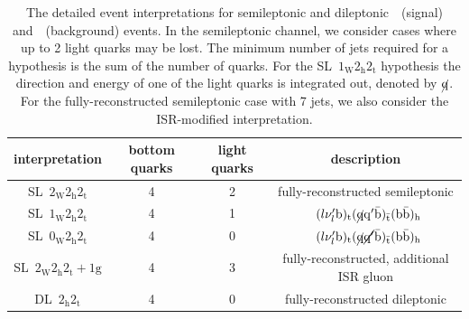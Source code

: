 \begin{table}[h!]
\begin{center}
\begin{tabular}{c|ccc}
\hline
interpretation & bottom quarks & light quarks & description \\
\hline
SL~$2_{\mathrm{W}} 2_{\mathrm{h}} 2_{\mathrm{t}}$ & 4 & 2 & fully-reconstructed semileptonic \\
SL~$1_{\mathrm{W}} 2_{\mathrm{h}} 2_{\mathrm{t}}$ & 4 & 1 &~$(l \nu_{l}' \mathrm{b})_{\mathrm{t}} (\cancel{\mathrm{q}} \mathrm{q}' \bar{\mathrm{b}})_{\bar{\mathrm{t}}} (\mathrm{b} \bar{\mathrm{b}})_{\mathrm{h}}$ \\
SL~$0_{\mathrm{W}} 2_{\mathrm{h}} 2_{\mathrm{t}}$ & 4 & 0 &~$(l \nu_{l}' \mathrm{b})_{\mathrm{t}} (\cancel{\mathrm{q}} \cancel{\mathrm{q}'} \bar{\mathrm{b}})_{\bar{\mathrm{t}}} (\mathrm{b} \bar{\mathrm{b}})_{\mathrm{h}}$ \\
SL~$2_{\mathrm{W}} 2_{\mathrm{h}} 2_{\mathrm{t}}+1\mathrm{g}$ & 4 & 3 & fully-reconstructed, additional ISR gluon \\
\hline
DL~$2_{\mathrm{h}} 2_{\mathrm{t}}$ & 4 & 0 & fully-reconstructed dileptonic \\
\hline
\hline
\end{tabular}
\caption[The MEM event interpretations considered for different final state topologies]{The detailed event interpretations for semileptonic and dileptonic~\ttH~(signal) and~\ttbb~(background) events. In the semileptonic channel, we consider cases where up to 2 light quarks may be lost. The minimum number of jets required for a hypothesis is the sum of the number of quarks. For the SL~$1_{\mathrm{W}} 2_{\mathrm{h}} 2_{\mathrm{t}}$ hypothesis the direction and energy of one of the light quarks is integrated out, denoted by $\cancel{\mathrm{q}}$. For the fully-reconstructed semileptonic case with 7 jets, we also consider the ISR-modified interpretation.}
\label{tab:event_interpretation_list}
\end{center}
\end{table}


